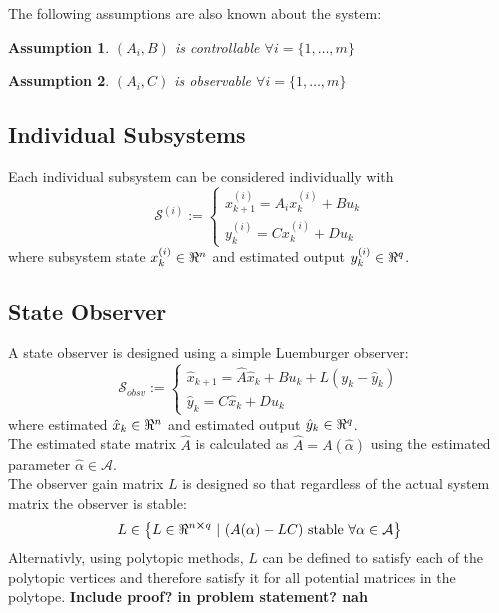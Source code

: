 \documentclass[]{article}
\newtheorem{assumption}{Assumption}
\begin{document}
The following assumptions are also known about the system:
\begin{assumption}\label{asmp:controllable}
    $(A_i, B)$ is controllable $\forall i = \{1, \dots, m\}$
\end{assumption}
\begin{assumption}\label{asmp:observable}
    $(A_i, C)$ is observable $\forall i = \{1, \dots, m\}$
\end{assumption}

\subsection{Individual Subsystems}
Each individual subsystem can be considered individually with
\begin{equation}\label{eq:subsys_def}
    \mathcal{S}^{(i)} :=
    \begin{cases}
        x_{k+1}^{(i)} = A_i x_k^{(i)} + B u_k\\
        y_{k}^{(i)} = C x_k^{(i)} + D u_k
    \end{cases}
\end{equation}
where subsystem state $x_k^{(i)} \in \real^n$ 
and estimated output $y_k^{(i)} \in \real^q$.\\

\subsection{State Observer}
A state observer is designed using a simple Luemburger observer:
\begin{equation}\label{eq:obsv_def}
    \mathcal{S}_{obsv} :=
    \begin{cases}
        \hat{x}_{k+1} = \hat{A} \hat{x}_k + B u_k + L(y_k - \hat{y}_k)\\
        \hat{y}_k = C \hat{x}_k + D u_k
    \end{cases}
\end{equation}
where estimated $\hat{x}_k \in \real^n$ and estimated output $\hat{y}_k \in \real^q$.\\
The estimated state matrix $\hat{A}$ is calculated as $\hat{A} = A(\hat{\alpha})$ 
using the estimated parameter $\hat{\alpha} \in \mathcal{A}$.\\
The observer gain matrix $L$ is designed so that regardless of the 
actual system matrix the observer is stable:
\begin{equation}\label{eq:L_requirments}
    L \in 
    \qty{L \in \real^{n \cross q} \ | \
        \qty(A(\alpha) - L C) \ \text{stable} \ \forall \alpha \in \mathcal{A}}
\end{equation}
Alternativly, using polytopic methods, $L$ can be defined to satisfy each of the polytopic 
vertices and therefore satisfy it for all potential matrices in the polytope. 
\textbf{Include proof? in problem statement? nah}\\
\end{document}
